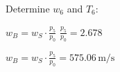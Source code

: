 Determine \( w_6 \) and \( T_6 \):  

\( w_B = w_S \cdot \frac{p_5}{p_0} \)  
\( \frac{p_5}{p_0} = 2.678 \)  

\( w_B = w_S \cdot \frac{p_5}{p_0} = 575.06 \, \text{m/s} \)